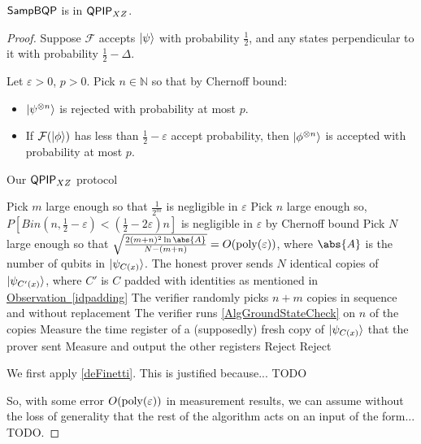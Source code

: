 \begin{theorem}
	$\operatorname{\mathsf{SampBQP}}$ is in $\operatorname{\mathsf{QPIP}}_{XZ}$.
\end{theorem}
\begin{proof}

Suppose $\mathcal{F}$ accepts $\ket{\psi}$ with probability $\frac{1}{2}$, and any states perpendicular to it with probability $\frac{1}{2}-\Delta$.

Let $\varepsilon>0$, $p>0$. Pick $n\in\mathbb{N}$ so that by Chernoff bound:
\begin{itemize}
	\item $\ket{\psi^{\otimes n}}$ is rejected with probability at most $p$.
	\item If $\mathcal{F}(\ket{\phi})$ has less than $\frac{1}{2}-\varepsilon$ accept probability, then $\ket{\phi^{\otimes n}}$ is accepted with probability at most $p$.
\end{itemize}

\begin{algorithm}
	\caption{Our $\operatorname{\mathsf{QPIP}}_{XZ}$ protocol}
	\label{AlgAmp1}
	\begin{algorithmic}[1]
		\State Pick $m$ large enough so that $\frac{1}{2^m}$ is negligible in $\varepsilon$
		\State Pick $n$ large enough so, $P\left[Bin(n, \frac{1}{2}-\varepsilon)<\left(\frac{1}{2}-2\varepsilon\right)n\right]$ is negligible in $\varepsilon$ by Chernoff bound
		\State Pick $N$ large enough so that $\sqrt{\frac{2(m+n)^2\ln\abs{A}}{N-(m+n)}}=O(\poly(\varepsilon))$, where $\abs{A}$ is the number of qubits in $\ket{\psi_{C(x)}}$.
		\State The honest prover sends $N$ identical copies of $\ket{\psi_{C'(x)}}$, where $C'$ is $C$ padded with identities as mentioned in \hyperref[idpadding]{Observation~\ref*{idpadding}}
		\State The verifier randomly picks $n+m$ copies in sequence and without replacement
		\State The verifier runs \autoref{AlgGroundStateCheck} on $n$ of the copies
				\State Measure the time register of a (supposedly) fresh copy of $\ket{\psi_{C(x)}}$ that the prover sent
					\State Measure and output the other registers
				\EndIf
			\EndFor
			\State Reject
		\Else
			\State Reject
		\EndIf
	\end{algorithmic}
\end{algorithm}

We first apply \autoref{deFinetti}. This is justified because... TODO

So, with some error $O(\operatorname*{\operatorname{poly}}(\varepsilon))$ in measurement results, we can assume without the loss of generality that the rest of the algorithm acts on an input of the form... TODO.


\end{proof}
